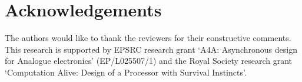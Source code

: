 \documentclass[british, journal]{IEEEtran}
\begin{document}

\section*{Acknowledgements}


The authors would like to thank the reviewers for their constructive
comments. This research is supported by EPSRC research grant `A4A:
Asynchronous design for Analogue electronics' (EP/L025507/1) and
the Royal Society research grant `Computation Alive: Design of a
Processor with Survival Instincts'.




\end{document}

